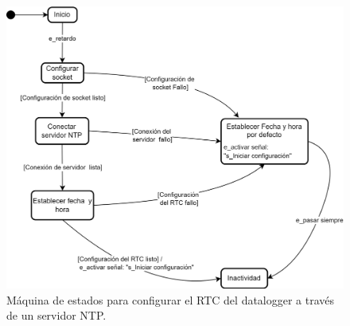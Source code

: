 


\begin{figure}[H]
    \centering
    \includegraphics[width=0.8\linewidth]{Figuras/datalogger/Firmware/sc_configRTC.png}
    \caption{Máquina de estados para configurar el RTC del datalogger a través de un servidor NTP.}
    \label{fig:sc_configRTC}
\end{figure}


